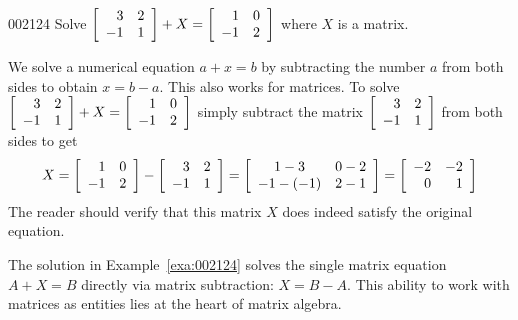 \begin{example}{}{002124} 
Solve 
$\left[ \begin{array}{rr}
3 & 2 \\
-1 & 1
\end{array} \right] + X = \left[ \begin{array}{rr}
1 & 0 \\
-1 & 2
\end{array} \right]$
 where $X$ is a matrix.


\begin{solution}
  We solve a numerical equation $a + x = b$ by subtracting the number $a$ from both sides to obtain $x = b - a$. This also works for matrices. To solve 
$\left[ \begin{array}{rr}
3 & 2 \\
-1 & 1
\end{array} \right] + X = \left[ \begin{array}{rr}
1 & 0 \\
-1 & 2
  \end{array} \right]$
 simply subtract the matrix 
 $\left[ \begin{array}{rr}
3 & 2 \\
-1 & 1
 \end{array} \right]$
 from both sides to get
\begin{equation*}
X = \left[ \begin{array}{rr}
1 & 0 \\
-1 & 2
\end{array} \right] - \left[ \begin{array}{rr}
3 & 2 \\
-1 & 1
\end{array} \right] = \left[ \begin{array}{cr}
1 - 3 & 0 - 2 \\
-1 - (-1) & 2 - 1
\end{array} \right] = \left[ \begin{array}{rr}
-2 & -2 \\
0 & 1
\end{array} \right]
\end{equation*}
The reader should verify that this matrix $X$ does indeed satisfy the original equation.
\end{solution}
\end{example}

The solution in Example~\ref{exa:002124} solves the single matrix equation $A + X = B$ directly via matrix subtraction: $X = B - A$. This ability to work with matrices as entities lies at the heart of matrix algebra.

